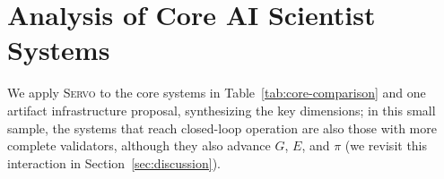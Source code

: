 \documentclass{article}
\newcommand{\framework}{\textsc{Servo}}
\begin{document}
\section{Analysis of Core AI Scientist Systems}
\label{sec:core}

We apply \framework{} to the core systems in Table~\ref{tab:core-comparison} and one artifact infrastructure proposal, synthesizing the key dimensions; in this small sample, the systems that reach closed-loop operation are also those with more complete validators, although they also advance $G$, $E$, and $\pi$ (we revisit this interaction in Section~\ref{sec:discussion}).

\vspace{6pt}
\begin{table}[h]
\centering
\small
\setlength{\tabcolsep}{4pt}
\caption{Comparative \framework{} analysis of core AI Scientist systems, including the pre-LLM Robot Scientist~\citep{sparkes2010robot} and the recent unified framework NovelSeek~\citep{zhang2025novelseek}. $V_s$=semantic, $V_e$=empirical, $V_h$=human. For AI Scientist (Nature~2026), $V_s$ is present but non-gating; the decisive acceptance gate is $V_h$ (ICLR peer review), consistent with \texttt{V\_gating=0} in the released coding (\texttt{analysis/systems.csv}).}
\label{tab:core-comparison}
\end{table}
\end{document}
